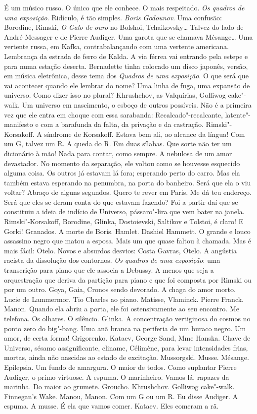 É um músico russo. O único que ele conhece. O mais respeitado. \emph{Os
quadros de uma exposição}. Ridículo, é tão simples. \emph{Boris
Godounov}. Uma confusão: Borodine, Rimski, \emph{O Galo de ouro} no
Bolshoi, Tchaikovsky\ldots{} Talvez do lado de André Messager e de Pierre
Audiger. Uma garota que se chamava Mésange\ldots{} Uma vertente russa, em
Kafka, contrabalançando com uma vertente americana. Lembrança da estrada
de ferro de Kalda. A via férrea vai entrando pela estepe e para numa
estação deserta. Bernadette tinha colocado um disco japonês, versão, em
música eletrônica, desse tema dos \emph{Quadros de uma exposição}. O que
será que vai acontecer quando ele lembrar do nome? Uma linha de fuga,
uma expansão de universo. Como dizer isso no plural? Khrushchov, as
Valquírias, Golliwog cake"-walk. Um universo em nascimento, o esboço de
outros possíveis. Não é a primeira vez que ele entra em choque com essa
sarabanda: Recalcado"-recalcante, latente"-manifesto e com a barafunda da %
falta, da privação e da castração. Rimski"-Korsakoff. A síndrome de
Korsakoff. Estava bem ali, ao alcance da língua! Com um G, talvez um R.
A queda do R. Em duas sílabas. Que sorte não ter um dicionário à mão!
Nada para contar, como sempre. A nebulosa de um amor devastador. No
momento da separação, ele voltou como se houvesse esquecido alguma
coisa. Os outros já estavam lá fora; esperando perto do carro. Mas ela
também estava esperando na penumbra, na porta do banheiro. Será que ela
o viu voltar? Abraço de alguns segundos. Quero te rever em Paris. Me dá
teu endereço. Será que eles se deram conta do que estavam fazendo? Foi a
partir daí que se constituiu a ideia de indício de Universo,
pássaro"-lira que vem bater na janela. Rimski"-Korsakoff, Borodine,
Glinka, Dostoievski, Saltikov e Tolstoi, é claro! E Gorki! Granados. A
morte de Boris. Hamlet. Dashiel Hammett. O grande e louco assassino
negro que matou a esposa. Mais um que quase faltou à chamada. Mas é mais
fácil: Otelo. Novos e absurdos desvios: Costa Gavras, Otelo. A angústia
racista da dissolução dos contornos. \emph{Os quadros de uma exposição}:
uma transcrição para piano que ele associa a Debussy. A menos que seja a
orquestração que deriva da partição para piano e que foi composta por
Rimski ou por um outro. Goya, Gaia, Cronos sendo devorado. A chaga do
amor morto. Lucie de Lammermor. Tio Charles ao piano. Matisse, Vlaminck.
Pierre Franck. Manon. Quando ela abriu a porta, ele foi ostensivamente
ao seu encontro. Me telefona. Os olhares. O silêncio. Glinka. A
concentração vertiginosa do cosmos no ponto zero do big"-bang. Uma anã
branca na periferia de um buraco negro. Um amor, de certa forma!
Grigorenko. Kataev, George Sand, Mme Hanska. Chave de Universo, sésamo %
assignificante, cliname, Célimène, para levar intensidades frias,
mortas, ainda não nascidas ao estado de excitação. Mussorgski. Musse.
Mésange. Epilepsia. Um fundo de amargura. O maior de todos. Como
suplantar Pierre Audiger, o primo virtuose. A espuma. O marinheiro.
Vamos lá, rapazes da marinha. Do maior ao grumete. Groucho. Khrushchov.
Golliwog cake"-walk. Finnegan's Wake. Manou, Manon. Com um G ou um R. Eu
disse Audiger. A espuma. A musse. É ela que vamos comer. Kataev. Eles
comeram a rã.

